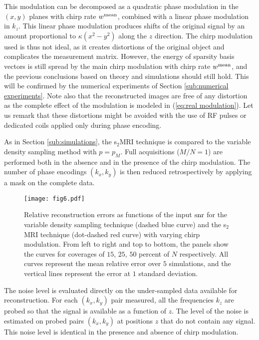 \documentclass[10pt,draftcls, onecolumn]{IEEEtran}
\begin{document}
This modulation can be decomposed as a quadratic phase modulation in the $(x, y)$ planes with chirp rate $w^{\rm mean}$, combined with a linear phase modulation in $k_z$. This linear phase modulation produces shifts of the original signal by an amount proportional to $\kappa (x^2 - y^2)$ along the $z$ direction. The chirp modulation used is thus not ideal, as it creates distortions of the original object and complicates the measurement matrix. However, the energy of sparsity basis vectors is still spread by the main chirp modulation with chirp rate $w^{\rm mean}$, and the previous conclusions based on theory and simulations should still hold. This will be confirmed by the numerical experiments of Section \ref{sub:numerical experiments}. Note also that the reconstructed images are free of any distortion as the complete effect of the modulation is modeled in (\ref{eq:real modulation}). Let us remark that these distortions might be avoided with the use of RF pulses or dedicated coils applied only during phase encoding.

As in Section \ref{sub:simulations}, the s$_2$MRI technique is compared to the variable density sampling method with $p = p_M$. Full acquisitions ($M/N = 1$) are performed both in the absence and in the presence of the chirp modulation. The number of phase encodings $(k_x, k_y)$ is then reduced retrospectively by applying a mask on the complete data.

\begin{figure}
\centering
\texttt{[image: fig6.pdf]}
\caption{\label{fig:curves error 3D} Relative reconstruction errors as functions of the input ${\rm snr}$ for the variable density sampling technique (dashed blue curve) and the s$_2$MRI technique (dot-dashed red curve) with varying chirp modulation. From left to right and top to bottom, the panels show the curves for coverages of $15$, $25$, $50$ percent of $N$ respectively. All curves represent the mean relative error over $5$ simulations, and the vertical lines represent the error at $1$ standard deviation.}
\vspace{-3mm}
\end{figure}


The noise level is evaluated directly on the under-sampled data available for reconstruction. For each $(k_x, k_y)$ pair measured, all the frequencies $k_z$ are probed so that the signal is available as a function of $z$. The level of the noise is estimated on probed pairs $(k_x, k_y)$ at positions $z$ that do not contain any signal. This noise level is identical in the presence and absence of chirp modulation.
\end{document}
